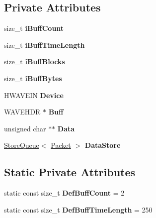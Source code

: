 \subsection*{Private Attributes}
\begin{DoxyCompactItemize}
\item 
\hypertarget{classcl_input_device_a184971b97547e1a6119f4af44f996393}{
size\_\-t {\bfseries iBuffCount}}
\label{classcl_input_device_a184971b97547e1a6119f4af44f996393}

\item 
\hypertarget{classcl_input_device_a73b47dded10fc1b9f18f9ba18de04e3e}{
size\_\-t {\bfseries iBuffTimeLength}}
\label{classcl_input_device_a73b47dded10fc1b9f18f9ba18de04e3e}

\item 
\hypertarget{classcl_input_device_ae5aa7e803422c5feef7f5676b64cdc6e}{
size\_\-t {\bfseries iBuffBlocks}}
\label{classcl_input_device_ae5aa7e803422c5feef7f5676b64cdc6e}

\item 
\hypertarget{classcl_input_device_ac01d21b959bb3a1cff21335aa8d8ebbb}{
size\_\-t {\bfseries iBuffBytes}}
\label{classcl_input_device_ac01d21b959bb3a1cff21335aa8d8ebbb}

\item 
\hypertarget{classcl_input_device_a503a9990e2b95596229ff531c0f19c5e}{
HWAVEIN {\bfseries Device}}
\label{classcl_input_device_a503a9990e2b95596229ff531c0f19c5e}

\item 
\hypertarget{classcl_input_device_aaa3a63bab8770841a28b6d9077985c67}{
WAVEHDR $\ast$ {\bfseries Buff}}
\label{classcl_input_device_aaa3a63bab8770841a28b6d9077985c67}

\item 
\hypertarget{classcl_input_device_ad7bbebe13d7c4f8fb9c4f690cc1c3675}{
unsigned char $\ast$$\ast$ {\bfseries Data}}
\label{classcl_input_device_ad7bbebe13d7c4f8fb9c4f690cc1c3675}

\item 
\hypertarget{classcl_input_device_a6d38d7387614333603e84258cc052d7f}{
\hyperlink{class_store_queue}{StoreQueue}$<$ \hyperlink{class_packet}{Packet} $>$ {\bfseries DataStore}}
\label{classcl_input_device_a6d38d7387614333603e84258cc052d7f}

\end{DoxyCompactItemize}
\subsection*{Static Private Attributes}
\begin{DoxyCompactItemize}
\item 
\hypertarget{classcl_input_device_af4080d46cfd1b9c59f01a49068eb0c3b}{
static const size\_\-t {\bfseries DefBuffCount} = 2}
\label{classcl_input_device_af4080d46cfd1b9c59f01a49068eb0c3b}

\item 
\hypertarget{classcl_input_device_a13abe37b83c9d59110f00b91185c00aa}{
static const size\_\-t {\bfseries DefBuffTimeLength} = 250}
\label{classcl_input_device_a13abe37b83c9d59110f00b91185c00aa}

\end{DoxyCompactItemize}


